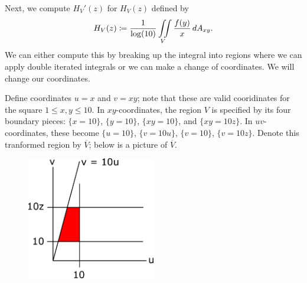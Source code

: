 Next, we compute \(H_V'(z)\) for \(H_V(z)\) defined by
\begin{equation}
H_V(z) \coloneqq \frac{1}{\log(10)} \iint\limits_V \frac{f(y)}{x}\, dA_{xy}. 
\end{equation}
We can either compute this by breaking up the integral into regions where we can apply double iterated integrals or we can make a
change of coordinates. We will change our coordinates.

Define coordinates \(u = x\) and \(v = xy\); note that these are valid cooridinates for the square \(1 \leq x, y \leq 10\). In \(xy\)-coordinates,
the region \(V\) is specified by its four boundary pieces: \(\{x = 10\}\), \(\{y = 10\}\), \(\{xy = 10\}\), and \(\{xy = 10z\}\). In \(uv\)-coordinates,
these become \(\{u = 10\}\), \(\{v = 10u\}\), \(\{v = 10\}\), \(\{v = 10z\}\). Denote this tranformed region by \(\overline{V}\); below is a picture of \(\overline{V}\).

\begin{figure}[h]
\centering
\includegraphics[width = 0.5\textwidth]{multiVarIntCalc/uvRegion.pdf}
\end{figure} 

